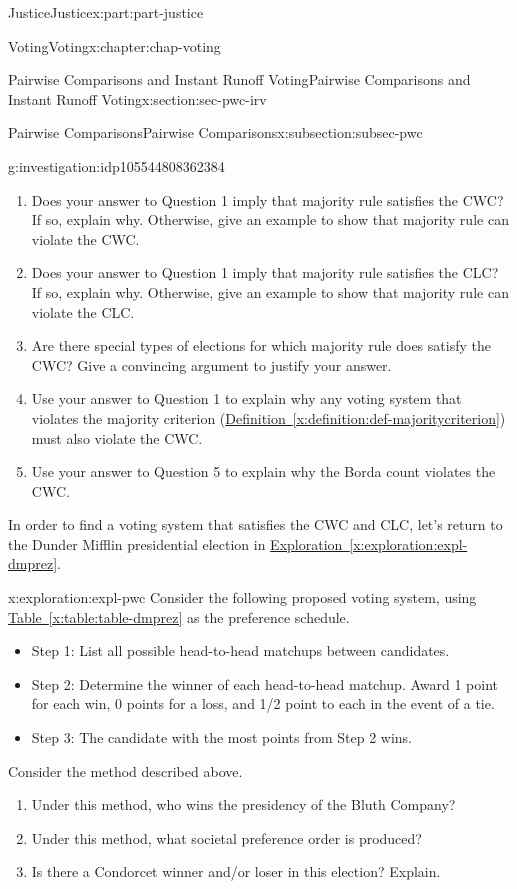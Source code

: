 \documentclass[oneside,10pt,]{book}
\newcommand{\xreffont}{\relax}
\numberwithin{equation}{section}
\begin{document}
\begin{partptx}{Justice}{}{Justice}{}{}{x:part:part-justice}
\begin{chapterptx}{Voting}{}{Voting}{}{}{x:chapter:chap-voting}
\begin{sectionptx}{Pairwise Comparisons and Instant Runoff Voting}{}{Pairwise Comparisons and Instant Runoff Voting}{}{}{x:section:sec-pwc-irv}
\begin{subsectionptx}{Pairwise Comparisons}{}{Pairwise Comparisons}{}{}{x:subsection:subsec-pwc}
\begin{investigation}{}{g:investigation:idp105544808362384}
\begin{enumerate}
\item{}Does your answer to Question 1 imply that majority rule satisfies the CWC? If so, explain why. Otherwise, give an example to show that majority rule can violate the CWC.%
\item{}Does your answer to Question 1 imply that majority rule satisfies the CLC? If so, explain why. Otherwise, give an example to show that majority rule can violate the CLC.%
\item{}Are there special types of elections for which majority rule does satisfy the CWC? Give a convincing argument to justify your answer.%
\item{}Use your answer to Question 1 to explain why any voting system that violates the majority criterion (\hyperref[x:definition:def-majoritycriterion]{Definition~{\xreffont\ref{x:definition:def-majoritycriterion}}}) must also violate the CWC.%
\item{}Use your answer to Question 5 to explain why the Borda count violates the CWC.%
\end{enumerate}
\end{investigation}%
In order to find a voting system that satisfies the CWC and CLC, let's return to the Dunder Mifflin presidential election in \hyperref[x:exploration:expl-dmprez]{Exploration~{\xreffont\ref{x:exploration:expl-dmprez}}}.%
\begin{exploration}{}{x:exploration:expl-pwc}%
Consider the following proposed voting system, using \hyperref[x:table:table-dmprez]{Table~{\xreffont\ref{x:table:table-dmprez}}} as the preference schedule.%
%
\begin{itemize}[label=\textbullet]
\item{}Step 1: List all possible head-to-head matchups between candidates.%
\item{}Step 2: Determine the winner of each head-to-head matchup. Award 1 point for each win, 0 points for a loss, and 1\slash{}2 point to each in the event of a tie.%
\item{}Step 3: The candidate with the most points from Step 2 wins.%
\end{itemize}
Consider the method described above.%
%
\begin{enumerate}
\item{}Under this method, who wins the presidency of the Bluth Company?%
\item{}Under this method, what societal preference order is produced?%
\item{}Is there a Condorcet winner and\slash{}or loser in this election? Explain.%

\end{enumerate}
\end{exploration}
\end{subsectionptx}
\end{sectionptx}
\end{chapterptx}
\end{partptx}
\end{document}
